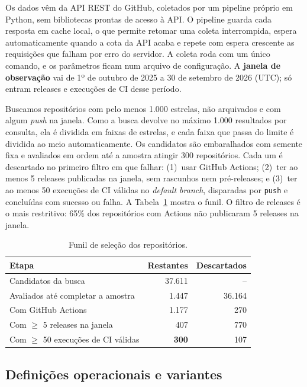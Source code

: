 \documentclass[12pt]{article}
\begin{document}
Os dados vêm da API REST do GitHub, coletados por um pipeline próprio em Python, sem
bibliotecas prontas de acesso à API. O pipeline guarda cada resposta em cache local,
o que permite retomar uma coleta interrompida, espera automaticamente quando a cota
da API acaba e repete com espera crescente as requisições que falham por erro do
servidor. A coleta roda com um único comando, e os parâmetros ficam num arquivo de
configuração. A \textbf{janela de observação} vai de 1º de outubro de 2025 a 30 de
setembro de 2026 (UTC); só entram releases e execuções de CI desse período.

Buscamos repositórios com pelo menos 1.000 estrelas, não arquivados e com algum
\textit{push} na janela. Como a busca devolve no máximo 1.000 resultados por
consulta, ela é dividida em faixas de estrelas, e cada faixa que passa do limite é
dividida ao meio automaticamente. Os candidatos são embaralhados com semente fixa e
avaliados em ordem até a amostra atingir 300 repositórios. Cada um é descartado no
primeiro filtro em que falhar: (1)~usar GitHub Actions; (2)~ter ao menos 5 releases
publicadas na janela, sem rascunhos nem pré-releases; e (3)~ter ao menos 50 execuções
de CI válidas no \textit{default branch}, disparadas por \texttt{push} e concluídas
com sucesso ou falha. A Tabela~\ref{tab:funil} mostra o funil. O filtro de releases é
o mais restritivo: 65\% dos repositórios com Actions não publicaram 5 releases na
janela.

\begin{table}[ht]
\centering
\caption{Funil de seleção dos repositórios.}\label{tab:funil}
\small
\begin{tabular}{lrr}
\toprule
Etapa & Restantes & Descartados \\
\midrule
Candidatos da busca & 37.611 & -- \\
Avaliados até completar a amostra & 1.447 & 36.164 \\
Com GitHub Actions & 1.177 & 270 \\
Com $\geq$ 5 releases na janela & 407 & 770 \\
Com $\geq$ 50 execuções de CI válidas & \textbf{300} & 107 \\
\bottomrule
\end{tabular}
\end{table}

\subsection{Definições operacionais e variantes}
\end{document}
